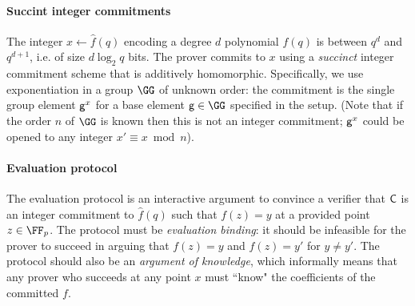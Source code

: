\paragraph{Succint integer commitments}
The integer $x \leftarrow \hat{f}(q)$ encoding a degree $d$ polynomial $f(q)$ is between $q^d$ and $q^{d+1}$, i.e. of size $d \log_2 q$ bits. The prover commits to $x$ using a \emph{succinct} integer commitment scheme that is additively homomorphic. Specifically, we use exponentiation in a group $\GG$ of unknown order: the commitment is the single group element $\mathsf{g}^x$ for a base element $\gr{g} \in \GG$ specified in the setup. (Note that if the order $n$ of $\GG$ is known then this is not an integer commitment; $\mathsf{g}^x$ could be opened to any integer $x' \equiv x \bmod n$). 

\begin{comment} 
The binary representation of this integer consists of $d\cdot \log_2(q)$ bits, which is about as large as the description of the polynomial itself. We therefore need a succinct cryptographic commitment\footnote{For now, we consider binding-only commitments which do not hide the committed value.} of the integer that preserves the homomorphic properties of the polynomial encoding. For this purpose we use exponentiation in a group of unknown order: $\ZZ \rightarrow \mathbb{G}, x \mapsto \gr{C} = \gr{g}^x$ for some random but fixed group element $\gr{g}$. As the order is unknown in these groups, the prover cannot reduce $x\in\ZZ$ and cannot learn a different integer discrete logarithm between $\gr{g}$ and $\gr{C}$. 
The commitment is succinct as the size of group elements in $\GG$ such as $\gr{g}^x$ is just determined by a security parameter.
This commitment function is also homomorphic, \emph{i.e.}, $\gr{g}^x\cdot \gr{g}^y=\gr{g}^{x+y}$, and thus preserves the homomorphic properties of the integer encoding of polynomials.
\end{comment}

\paragraph{Evaluation protocol}
The evaluation protocol is an interactive argument to convince a verifier that $\mathsf{C}$ is an integer commitment to $\hat{f}(q)$ such that $f(z) = y$ at a provided point $z \in \FF_p$. The protocol must be \emph{evaluation binding}: it should be infeasible for the prover to succeed in arguing that $f(z) = y$ and $f(z) = y'$ for $y \neq y'$. The protocol should also be an \emph{argument of knowledge}, which informally means that any prover who succeeds at any point $x$ must ``know" the coefficients of the committed $f$. 

